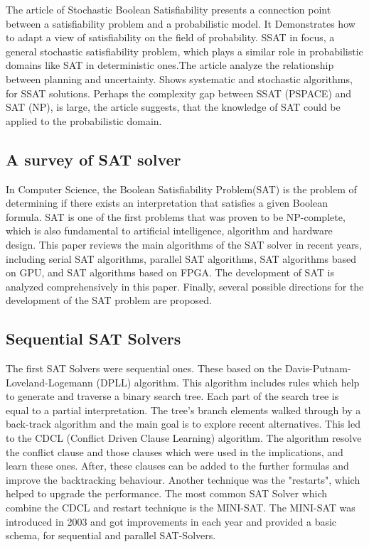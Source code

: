 \documentclass{article}
\begin{document}
The article of Stochastic Boolean Satisfiability presents a connection point between a satisfiability problem and a probabilistic model. It Demonstrates how to adapt a view of satisfiability on the field of probability. SSAT in focus, a general stochastic satisfiability problem, which plays a similar role in probabilistic domains like SAT in deterministic ones.The article analyze the relationship between planning and uncertainty. Shows systematic and stochastic algorithms, for SSAT solutions. Perhaps the complexity gap between SSAT (PSPACE) and SAT (NP), is large, the article suggests, that the knowledge of SAT could be applied to the probabilistic domain.

\subsection{A survey of SAT solver \cite{surveyOfSatSolvers}}

In Computer Science, the Boolean Satisfiability Problem(SAT) is the problem of determining if there exists an interpretation that satisfies a given Boolean formula. SAT is one of the first problems that was proven to be NP-complete, which is also fundamental to artificial intelligence, algorithm and hardware design. This paper reviews the main algorithms of the SAT solver in recent years, including serial SAT algorithms, parallel SAT algorithms, SAT algorithms based on GPU, and SAT algorithms based on FPGA. The development of SAT is analyzed comprehensively in this paper. Finally, several possible directions for the development of the SAT problem are proposed.

\subsection{Sequential SAT Solvers}

The first SAT Solvers were sequential ones. These based on the Davis-Putnam-Loveland-Logemann (DPLL) algorithm. This algorithm includes rules which help to generate and traverse a binary search tree. Each part of the search tree is equal to a partial interpretation. The tree's branch elements walked through by a back-track algorithm and the main goal is to explore recent alternatives. This led to the CDCL (Conflict Driven Clause Learning) algorithm. The algorithm resolve the conflict clause and those clauses which were used in the implications, and learn these ones. After, these clauses can be added to the further formulas and improve the backtracking behaviour. Another technique was the "restarts", which helped to upgrade the performance. The most common SAT Solver which combine the CDCL and restart technique is the MINI-SAT. The MINI-SAT was introduced in 2003 and got improvements in each year and provided a basic schema, for sequential and parallel SAT-Solvers.
\end{document}

